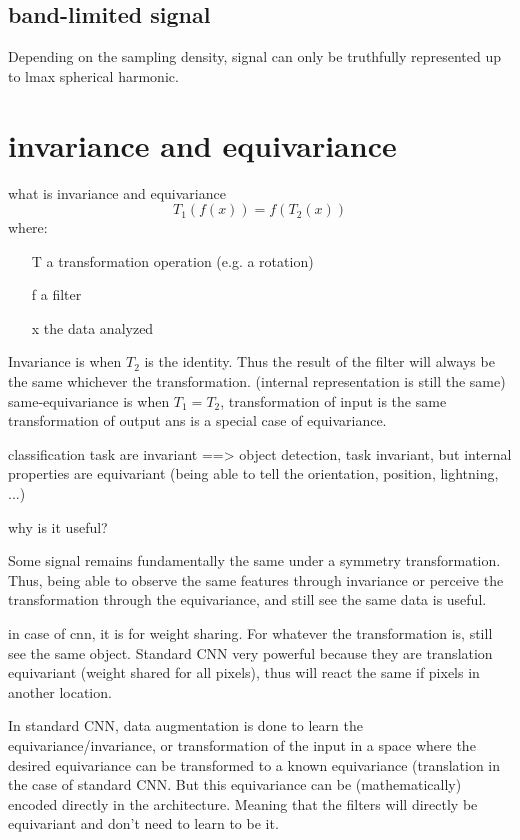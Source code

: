 \documentclass[11pt]{report}
\begin{document}
\subsection{band-limited signal} %
 Depending on the sampling density, signal can only be truthfully represented up to lmax spherical harmonic.
 
\section{invariance and equivariance}
what is invariance and equivariance
\begin{equation}
    T_1(f(x)) = f(T_2(x))
\end{equation}
where:
\begin{itemize}
    \item[T] a transformation operation (e.g. a rotation)
    \item[f] a filter
    \item[x] the data analyzed
\end{itemize}
Invariance is when $T_2$ is the identity. Thus the result of the filter will always be the same whichever the transformation. (internal representation is still the same)
same-equivariance is when $T_1 = T_2$, transformation of input is the same transformation of output ans is a special case of equivariance.

classification task are invariant ==> object detection, task invariant, but internal properties are equivariant (being able to tell the orientation, position, lightning, ...) 

why is it useful?

Some signal remains fundamentally the same under a symmetry transformation. Thus, being able to observe the same features through invariance or perceive the transformation through the equivariance, and still see the same data is useful.

in case of cnn, it is for weight sharing. For whatever the transformation is, still see the same object.
Standard CNN very powerful because they are translation equivariant (weight shared for all pixels), thus will react the same if pixels in another location.

In standard CNN, data augmentation is done to learn the equivariance/invariance, or transformation of the input in a space where the desired equivariance can be transformed to a known equivariance (translation in the case of standard CNN. But this equivariance can be (mathematically) encoded directly in the architecture. Meaning that the filters will directly be equivariant and don't need to learn to be it.
\end{document}
